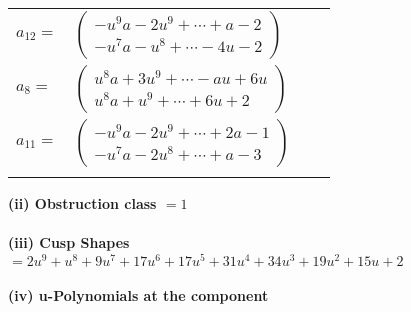 \documentclass[1p]{elsarticle_modified}
\theoremstyle{definition}
\begin{document}
\begin{tabular}{m{7pt} m{180pt} m{7pt} m{180pt} }
\flushright $a_{12}=$&$\begin{pmatrix}- u^9 a-2 u^9+\cdots+a-2\\- u^7 a- u^8+\cdots-4 u-2\end{pmatrix}$ \\
\flushright $a_{8}=$&$\begin{pmatrix}u^8 a+3 u^9+\cdots- a u+6 u\\u^8 a+u^9+\cdots+6 u+2\end{pmatrix}$ \\
\flushright $a_{11}=$&$\begin{pmatrix}- u^9 a-2 u^9+\cdots+2 a-1\\- u^7 a-2 u^8+\cdots+a-3\end{pmatrix}$\\&\end{tabular}
\flushleft \textbf{(ii) Obstruction class $= 1$}\\~\\
\flushleft \textbf{(iii) Cusp Shapes $= 2 u^9+u^8+9 u^7+17 u^6+17 u^5+31 u^4+34 u^3+19 u^2+15 u+2$}\\~\\
\newpage\renewcommand{\arraystretch}{1}
\flushleft \textbf{(iv) u-Polynomials at the component}\newline \\
\end{document}
